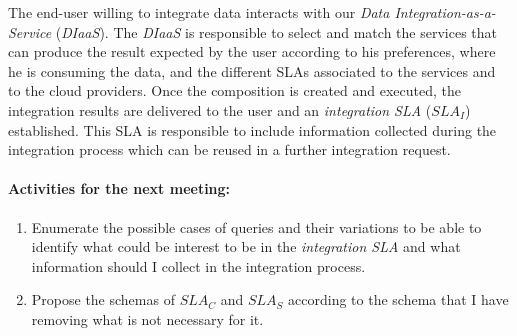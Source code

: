 \documentclass[12pt,a4paper,oneside]{report}
\begin{document}
The end-user willing to integrate data interacts with our \textsl{Data Integration-as-a-Service} (\textsl{DIaaS}). The \textsl{DIaaS} is responsible to select and match the services that can produce the result expected by the user according to his preferences, where he is consuming the data, and the different SLAs associated to the services and to the cloud providers. Once the composition is created and executed, the integration results are delivered to the user and an \textsl{integration SLA} ($SLA_{I}$) established. This SLA is responsible to include information collected during the integration process which can be reused in a further integration request.

\paragraph{Activities for the next meeting:}
\begin{enumerate}
\item Enumerate the possible cases of queries and their variations to be able to identify what could be interest to be in the \textsl{integration SLA} and what information should I collect in the integration process.
\item Propose the schemas of $SLA_{C}$ and $SLA_{S}$ according to the schema that I have removing what is not necessary for it.
\end{enumerate}
\end{document}
